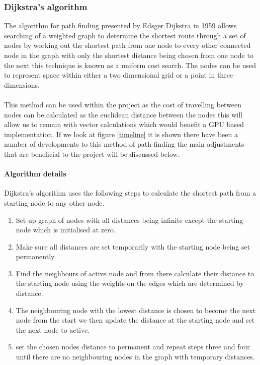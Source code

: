 \subsubsection{Dijkstra's algorithm}
The algorithm for path finding presented by Edsger Dijkstra in 1959 \cite{dijkstra} allows searching of a weighted graph to determine the shortest route through a set of nodes by working out the shortest path from one node to every other connected node in the graph with only the shortest distance being chosen from one node to the next this technique is known as a uniform cost search. The nodes can be used to represent space within either a two dimensional grid or a point in three dimensions.\\\\ This method can be used within the project as the cost of travelling between nodes can be calculated as the euclidean distance between the nodes this will allow us to remain with vector calculations which would benefit a GPU based implementation. If we look at figure \ref{timeline} it is shown there have been a number of developments to this method of path-finding the main adjustments that are beneficial to the project will be discussed below.
\paragraph{Algorithm details}
Dijkstra's algorithm uses the following steps to calculate the shortest path from a starting node to any other node.

\begin{enumerate}
	\item Set up graph of nodes with all distances being infinite except the starting node which is initialised at zero.
	\item Make sure all distances are set temporarily with the starting node being set permanently
	\item Find the neighbours of active node and from there calculate their distance to the starting node using the weights on the edges which are determined by distance.
	\item The neighbouring node with the lowest distance is chosen to become the next node from the start we then update the distance at the starting node and set the next node to active.
	\item set the chosen nodes distance to permanent and repeat steps three and four until there are no neighbouring nodes in the graph with temporary distances.      
\end{enumerate}
 
